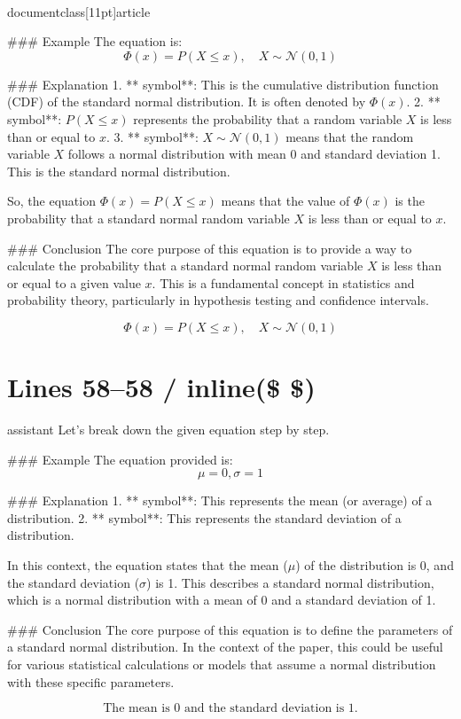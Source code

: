 \\documentclass[11pt]{article}
\begin{document}
### Example
The equation is:
\[
\Phi(x) = P(X \le x), \quad X \sim \mathcal{N}(0,1)
\]

### Explanation
1. ** symbol**: This is the cumulative distribution function (CDF) of the standard normal distribution. It is often denoted by \(\Phi(x)\).
2. ** symbol**: \(P(X \le x)\) represents the probability that a random variable \(X\) is less than or equal to \(x\).
3. ** symbol**: \(X \sim \mathcal{N}(0,1)\) means that the random variable \(X\) follows a normal distribution with mean 0 and standard deviation 1. This is the standard normal distribution.

So, the equation \(\Phi(x) = P(X \le x)\) means that the value of \(\Phi(x)\) is the probability that a standard normal random variable \(X\) is less than or equal to \(x\).

### Conclusion
The core purpose of this equation is to provide a way to calculate the probability that a standard normal random variable \(X\) is less than or equal to a given value \(x\). This is a fundamental concept in statistics and probability theory, particularly in hypothesis testing and confidence intervals.

\[
\boxed{\Phi(x) = P(X \le x), \quad X \sim \mathcal{N}(0,1)}
\]


\section*{Lines 58–58 / inline(\$ \$) }
assistant
Let's break down the given equation step by step.

### Example
The equation provided is:
\[
\mu = 0, \sigma = 1
\]

### Explanation
1. ** symbol**: This represents the mean (or average) of a distribution.
2. ** symbol**: This represents the standard deviation of a distribution.

In this context, the equation states that the mean (\(\mu\)) of the distribution is 0, and the standard deviation (\(\sigma\)) is 1. This describes a standard normal distribution, which is a normal distribution with a mean of 0 and a standard deviation of 1.

### Conclusion
The core purpose of this equation is to define the parameters of a standard normal distribution. In the context of the paper, this could be useful for various statistical calculations or models that assume a normal distribution with these specific parameters.

\[
\boxed{\text{The mean is 0 and the standard deviation is 1.}}
\]
\end{document}

